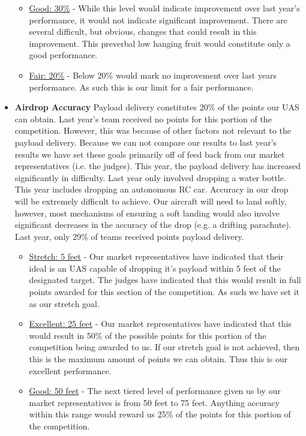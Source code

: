 \documentclass[]{auvsi_doc}
\begin{document}
\begin{itemize}
\begin{itemize}
	\item \underline{Good: 30\%} -  While this level would indicate improvement over last year's performance, it would not indicate significant improvement. There are several difficult, but obvious, changes that could result in this improvement. This preverbal low hanging fruit would constitute only a good performance.
	\item  \underline{Fair: 20\%} -  Below 20\% would mark no improvement over last years performance. As such this is our limit for a fair performance.
	\end{itemize}
\item \textbf{Airdrop Accuracy} Payload delivery constitutes 20\% of the points our UAS can obtain. Last year's team received no points for this portion of the competition. However, this was because of other factors not relevant to the payload delivery. Because we can not compare our results to last year's results we have set these goals primarily off of feed back from our market representatives (i.e. the judges). This year, the payload delivery has increased significantly in difficulty. Last year only involved dropping a water bottle. This year includes dropping an autonomous RC car. Accuracy in our drop will be extremely difficult to achieve. Our aircraft will need to land softly, however, most mechanisms of ensuring a soft landing would also involve significant decreases in the accuracy of the drop (e.g. a drifting parachute). Last year, only 29\% of teams received points payload delivery. 
	\begin{itemize}
	\item \underline{Stretch: 5 feet} -  Our market representatives have indicated that their ideal is an UAS capable of dropping it's payload within 5 feet of the designated target. The judges have indicated that this would result in full points awarded for this section of the competition. As such we have set it as our stretch goal.
	\item \underline{Excellent: 25 feet} -  Our market representatives have indicated that this would result in 50\% of the possible points for this portion of the competition being awarded to us. If our stretch goal is not achieved, then this is the maximum amount of points we can obtain. Thus this is our excellent performance.
	\item \underline{Good: 50 feet} -  The next tiered level of performance given us by our market representatives is from 50 feet to 75 feet. Anything accuracy within this range would reward us 25\% of the points for this portion of the competition.

\end{itemize}
\end{itemize}
\end{document}
